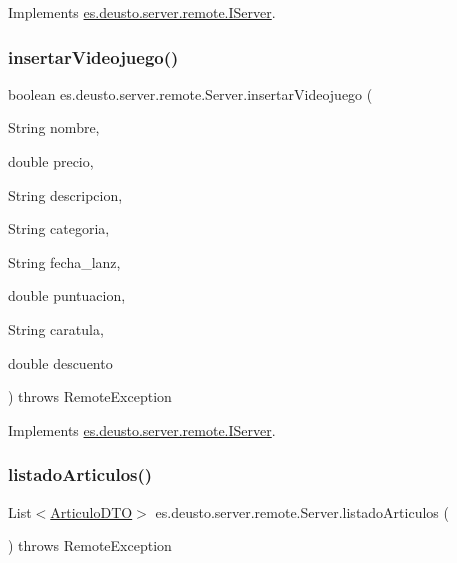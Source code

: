 Implements \mbox{\hyperlink{interfacees_1_1deusto_1_1server_1_1remote_1_1_i_server_aef2c6618c8d38cbd221c290875f37e69}{es.\+deusto.\+server.\+remote.\+I\+Server}}.

\mbox{\label{classes_1_1deusto_1_1server_1_1remote_1_1_server_a406e093c958d4b85be33d55f79b9879e}} 
\subsubsection{\texorpdfstring{insertarVideojuego()}{insertarVideojuego()}}
{\footnotesize\ttfamily boolean es.\+deusto.\+server.\+remote.\+Server.\+insertar\+Videojuego (\begin{DoxyParamCaption}\item[{String}]{nombre,  }\item[{double}]{precio,  }\item[{String}]{descripcion,  }\item[{String}]{categoria,  }\item[{String}]{fecha\+\_\+lanz,  }\item[{double}]{puntuacion,  }\item[{String}]{caratula,  }\item[{double}]{descuento }\end{DoxyParamCaption}) throws Remote\+Exception}



Implements \mbox{\hyperlink{interfacees_1_1deusto_1_1server_1_1remote_1_1_i_server_a41c5cae2283787ff002699c2ff1d5877}{es.\+deusto.\+server.\+remote.\+I\+Server}}.

\mbox{\label{classes_1_1deusto_1_1server_1_1remote_1_1_server_af92422f6c88a176f9f424f3d9016ee00}} 
\subsubsection{\texorpdfstring{listadoArticulos()}{listadoArticulos()}}
{\footnotesize\ttfamily List$<$\mbox{\hyperlink{classes_1_1deusto_1_1server_1_1dto_1_1_articulo_d_t_o}{Articulo\+D\+TO}}$>$ es.\+deusto.\+server.\+remote.\+Server.\+listado\+Articulos (\begin{DoxyParamCaption}{ }\end{DoxyParamCaption}) throws Remote\+Exception}




